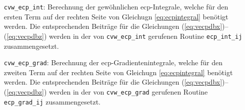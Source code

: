 	\begin{itemize}[leftmargin=77pt]
	\item[\texttt{cvw\_ecp\_int}:] Berechnung der gewöhnlichen \ac{ecp}-Integrale, welche für den ersten Term auf der rechten Seite von Gleichugn \ref{eq:ecpintegral} benötigt werden. Die entsprechenden Beiträge für die Gleichungen (\ref{eq:vecpdbx})--(\ref{eq:vecpdbz}) werden in der von \texttt{cvw\_ecp\_int} gerufenen Routine \texttt{ecp\_int\_ij} zusammengesetzt.
	\item[\texttt{cvw\_ecp\_grad}:] Berechnung der \ac{ecp}-Gradientenintegrale, welche für den zweiten Term auf der rechten Seite von Gleichugn \ref{eq:ecpintegral} benötigt werden. Die entsprechenden Beiträge für die Gleichungen (\ref{eq:vecpdbx})--(\ref{eq:vecpdbz}) werden in der von \texttt{cvw\_ecp\_grad} gerufenen Routine \texttt{ecp\_grad\_ij} zusammengesetzt.
	\end{itemize} 
	
